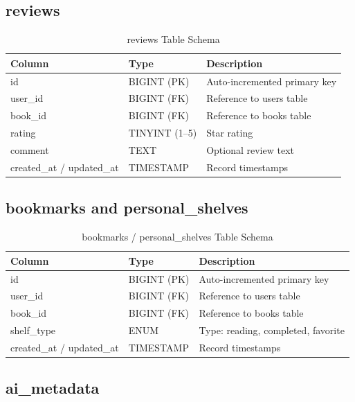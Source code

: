 \subsection{reviews}

\begin{table}[H]
\centering
\caption{reviews Table Schema}
\begin{tabularx}{\textwidth}{|l|l|X|}
\hline
\textbf{Column} & \textbf{Type} & \textbf{Description} \\
\hline
id        & BIGINT (PK)     & Auto-incremented primary key \\
\hline
user\_id  & BIGINT (FK)     & Reference to users table \\
\hline
book\_id  & BIGINT (FK)     & Reference to books table \\
\hline
rating    & TINYINT (1--5)  & Star rating \\
\hline
comment   & TEXT            & Optional review text \\
\hline
created\_at / updated\_at & TIMESTAMP & Record timestamps \\
\hline
\end{tabularx}
\end{table}

\subsection{bookmarks and personal\_shelves}

\begin{table}[H]
\centering
\caption{bookmarks / personal\_shelves Table Schema}
\begin{tabularx}{\textwidth}{|l|l|X|}
\hline
\textbf{Column} & \textbf{Type} & \textbf{Description} \\
\hline
id           & BIGINT (PK)  & Auto-incremented primary key \\
\hline
user\_id     & BIGINT (FK)  & Reference to users table \\
\hline
book\_id     & BIGINT (FK)  & Reference to books table \\
\hline
shelf\_type  & ENUM         & Type: reading, completed, favorite \\
\hline
created\_at / updated\_at & TIMESTAMP & Record timestamps \\
\hline
\end{tabularx}
\end{table}

\subsection{ai\_metadata}

